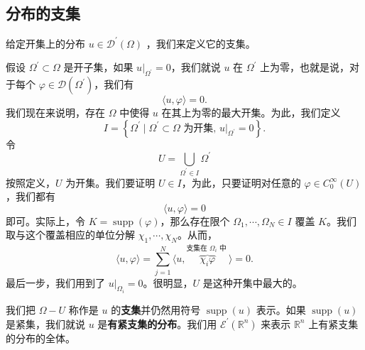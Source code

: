 \subsection{分布的支集}

给定开集上的分布 $u \in \mathcal{D}^{\prime}(\Omega)$ ，我们来定义它的支集。

假设 $\Omega^{\prime} \subset \Omega$ 是开子集，如果 $\left.u\right|_{\Omega^{\prime}}=0$，我们就说 $u$ 在 $\Omega^{\prime}$ 上为零，也就是说，对于每个 $\varphi \in \mathcal{D}\left(\Omega^{\prime}\right)$，我们有
\[
\langle u, \varphi\rangle=0.
\]
我们现在来说明，存在 $\Omega$ 中使得 $u$ 在其上为零的最大开集。为此，我们定义
\[
I=\left\{\Omega^{\prime} \mid \Omega^{\prime} \subset \Omega \text { 为开集, }\left.u\right|_{\Omega^{\prime}}=0\right\}.
\]
令
\[
U=\bigcup_{\Omega^{\prime} \in I} \Omega^{\prime}
\]
按照定义，$U$ 为开集。我们要证明 $U \in I$，为此，只要证明对任意的 $\varphi \in C_0^{\infty}(U)$，我们都有
\[
\langle u, \varphi\rangle=0
\]
即可。实际上，令 $K=\operatorname{supp}(\varphi)$，那么存在限个 $\Omega_1, \cdots, \Omega_N \in I$ 覆盖 $K$。我们取与这个覆盖相应的单位分解 $\chi_1, \cdots, \chi_N$。从而，
\[
\langle u, \varphi\rangle=\sum_{j=1}^N\langle u, \overbrace{\chi_i \varphi}^{\text {支集在 } \Omega_i \text { 中 }}\rangle=0.
\]
最后一步，我们用到了 $\left.u\right|_{\Omega_i}=0$。很明显，$U$ 是这种开集中最大的。

\begin{definition}[分布的 (紧) 支集]
我们把 $\Omega-U$ 称作是 $u$ 的\textbf{支集}并仍然用符号 $\operatorname{supp}(u)$ 表示。如果 $\operatorname{supp}(u)$ 是紧集，我们就说 $u$ 是\textbf{有紧支集的分布}。我们用 $\mathcal{E}^{\prime}\left(\mathbb{R}^n\right)$ 来表示 $\mathbb{R}^n$ 上有紧支集的分布的全体。
\end{definition}